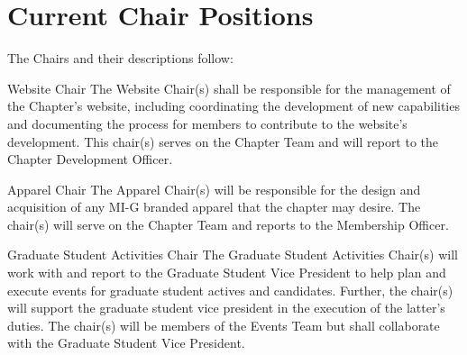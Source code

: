 \section{Current Chair Positions}
The Chairs and their descriptions follow:\\
\begin{enumsubsection}

\item{Website Chair}
The Website Chair(s) shall be responsible for the management of the Chapter’s website, including coordinating the development of new capabilities and documenting the process for members to contribute to the website’s development.
This chair(s) serves on the Chapter Team and will report to the Chapter Development Officer.
\item{Apparel Chair}
The Apparel Chair(s) will be responsible for the design and acquisition of any MI-G branded apparel that the chapter may desire.
The chair(s) will serve on the Chapter Team and reports to the Membership Officer.
\item{Graduate Student Activities Chair}
The Graduate Student Activities Chair(s) will work with and report to the Graduate Student Vice President to help plan and execute events for graduate student actives and candidates.
Further, the chair(s) will support the graduate student vice president in the execution of the latter's duties.
The chair(s) will be members of the Events Team but shall collaborate with the Graduate Student Vice President.


\end{enumsubsection}
